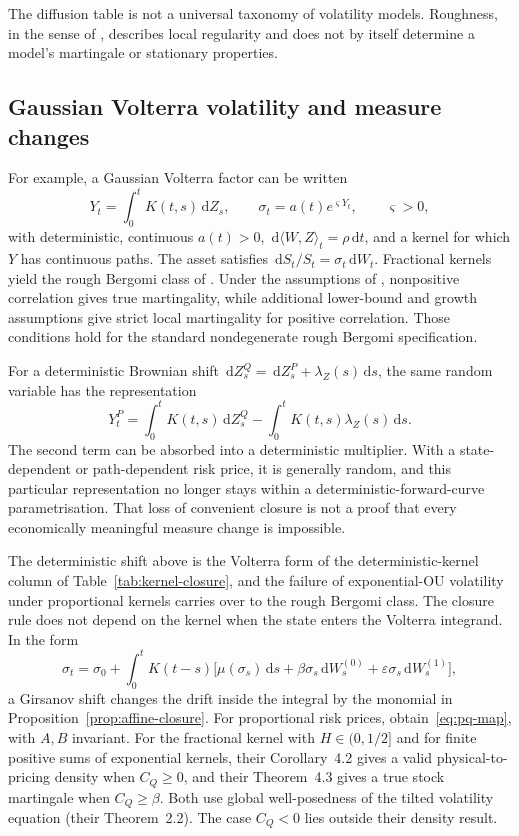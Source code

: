 \documentclass[11pt,a4paper]{article}
\theoremstyle{definition}
\theoremstyle{remark}
\newcommand{\dd}{\,\mathrm{d}}
\begin{document}
The diffusion table is not a universal taxonomy of volatility models. Roughness, in the sense of \citet{GatheralJaissonRosenbaum2018}, describes local regularity and does not by itself determine a model's martingale or stationary properties.

\subsection{Gaussian Volterra volatility and measure changes}

For example, a Gaussian Volterra factor can be written
\[
 Y_t=\int_0^t K(t,s)\dd Z_s,\qquad
 \sigma_t=a(t)e^{\varsigma Y_t},\qquad \varsigma>0,
\]
with deterministic, continuous \(a(t)>0\), \(\dd\langle W,Z\rangle_t=\rho\dd t\), and a kernel for which \(Y\) has continuous paths. The asset satisfies \(\dd S_t/S_t=\sigma_t\dd W_t\). Fractional kernels yield the rough Bergomi class of \citet{BayerFrizGatheral2016}. Under the assumptions of \citet[Theorem~1]{Gassiat2019}, nonpositive correlation gives true martingality, while additional lower-bound and growth assumptions give strict local martingality for positive correlation. Those conditions hold for the standard nondegenerate rough Bergomi specification.

For a deterministic Brownian shift \(\dd Z_s^Q=\dd Z_s^P+\lambda_Z(s)\dd s\), the same random variable has the representation
\[
 Y_t^P=\int_0^tK(t,s)\dd Z_s^Q-\int_0^tK(t,s)\lambda_Z(s)\dd s.
\]
The second term can be absorbed into a deterministic multiplier. With a state-dependent or path-dependent risk price, it is generally random, and this particular representation no longer stays within a deterministic-forward-curve parametrisation. That loss of convenient closure is not a proof that every economically meaningful measure change is impossible.

The deterministic shift above is the Volterra form of the deterministic-kernel column of Table~\ref{tab:kernel-closure}, and the failure of exponential-OU volatility under proportional kernels carries over to the rough Bergomi class. The closure rule does not depend on the kernel when the state enters the Volterra integrand. In the form
\[
 \sigma_t=\sigma_0+\int_0^tK(t-s)\bigl[\mu(\sigma_s)\dd s+\beta\sigma_s\dd W_s^{(0)}+\varepsilon\sigma_s\dd W_s^{(1)}\bigr],
\]
a Girsanov shift changes the drift inside the integral by the monomial in Proposition~\ref{prop:affine-closure}. For proportional risk prices, \citet[Proposition~4.1]{SeppRakhmonovRoughLogSV2026} obtain~\eqref{eq:pq-map}, with $A,B$ invariant. For the fractional kernel with $H\in(0,1/2]$ and for finite positive sums of exponential kernels, their Corollary~4.2 gives a valid physical-to-pricing density when $C_Q\geq0$, and their Theorem~4.3 gives a true stock martingale when $C_Q\geq\beta$. Both use global well-posedness of the tilted volatility equation (their Theorem~2.2). The case $C_Q<0$ lies outside their density result.
\end{document}
